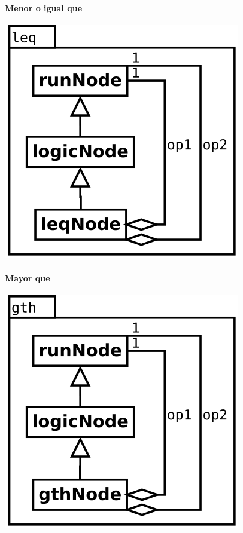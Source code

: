 \paragraph {Menor o igual que}
\begin{center}
\includegraphics[scale=0.4]{leq.png} \\
\end{center}

\paragraph {Mayor que}
\begin{center}
\includegraphics[scale=0.4]{gth.png} \\
\end{center}

